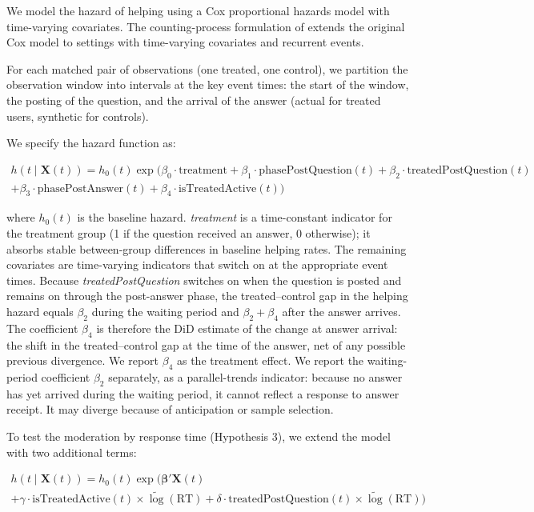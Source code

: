 We model the hazard of helping using a Cox proportional hazards model with time-varying covariates. The counting-process formulation of \citet{andersen_gill_1982} extends the original Cox model \citep{cox_regression_1972} to settings with time-varying covariates and recurrent events.

For each matched pair of observations (one treated, one control), we partition the observation window into intervals at the key event times: the start of the window, the posting of the question, and the arrival of the answer (actual for treated users, synthetic for controls).

We specify the hazard function as:

\begin{multline}
\label{eq:cox}
h(t \mid \mathbf{X}(t)) = h_0(t) \exp\big(\beta_0 \cdot \text{treatment} + \beta_1 \cdot \text{phasePostQuestion}(t) + \beta_2 \cdot \text{treatedPostQuestion}(t) \\
+ \beta_3 \cdot \text{phasePostAnswer}(t) + \beta_4 \cdot \text{isTreatedActive}(t) \big)
\end{multline}

\noindent where $h_0(t)$ is the baseline hazard. \textit{treatment} is a time-constant indicator for the treatment group (1 if the question received an answer, 0 otherwise); it absorbs stable between-group differences in baseline helping rates. The remaining covariates are time-varying indicators that switch on at the appropriate event times. Because \textit{treatedPostQuestion} switches on when the question is posted and remains on through the post-answer phase, the treated--control gap in the helping hazard equals $\beta_2$ during the waiting period and $\beta_2 + \beta_4$ after the answer arrives. The coefficient $\beta_4$ is therefore the DiD estimate of the change at answer arrival: the shift in the treated--control gap at the time of the answer, net of any possible previous divergence. We report $\beta_4$ as the treatment effect. We report the waiting-period coefficient $\beta_2$ separately, as a parallel-trends indicator: because no answer has yet arrived during the waiting period, it cannot reflect a response to answer receipt. It may diverge because of  anticipation or sample selection.

To test the moderation by response time (Hypothesis 3), we extend the model with two additional terms:

\begin{multline}
\label{eq:cox_speed}
h(t \mid \mathbf{X}(t)) = h_0(t) \exp\Big(\boldsymbol{\beta}' \mathbf{X}(t) \\
+ \gamma \cdot \text{isTreatedActive}(t) \times \widetilde{\log}(\text{RT}) + \delta \cdot \text{treatedPostQuestion}(t) \times \widetilde{\log}(\text{RT}) \Big)
\end{multline}

